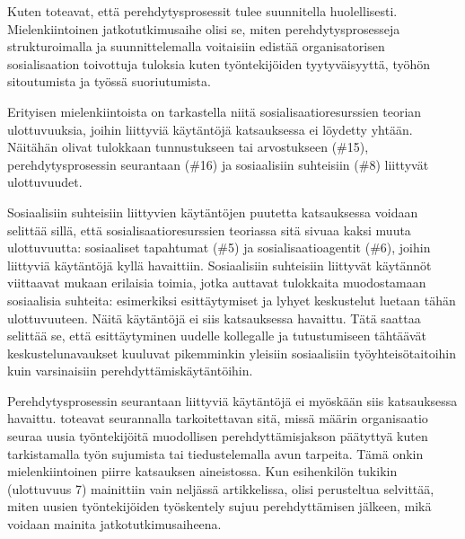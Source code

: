 \documentclass[utf8]{gradu3}
\begin{document}
Kuten \textcite{britto-ym-2020} toteavat, että perehdytysprosessit tulee suunnitella huolellisesti. Mielenkiintoinen jatkotutkimusaihe olisi se, miten perehdytysprosesseja strukturoimalla ja suunnittelemalla voitaisiin edistää organisatorisen sosialisaation toivottuja tuloksia kuten työntekijöiden tyytyväisyyttä, työhön sitoutumista ja työssä suoriutumista.

Erityisen mielenkiintoista on tarkastella niitä sosialisaatioresurssien teorian ulottuvuuksia, joihin liittyviä käytäntöjä katsauksessa ei löydetty yhtään. Näitähän olivat tulokkaan tunnustukseen tai arvostukseen (\#15), perehdytysprosessin seurantaan (\#16) ja sosiaalisiin suhteisiin (\#8) liittyvät ulottuvuudet. 

Sosiaalisiin suhteisiin liittyvien käytäntöjen puutetta katsauksessa voidaan selittää sillä, että sosialisaatioresurssien teoriassa sitä sivuaa kaksi muuta ulottuvuutta: sosiaaliset tapahtumat (\#5) ja sosialisaatioagentit (\#6), joihin liittyviä käytäntöjä kyllä havaittiin. Sosiaalisiin suhteisiin liittyvät käytännöt viittaavat \textcite{wanberg-2012} mukaan erilaisia toimia, jotka auttavat tulokkaita muodostamaan sosiaalisia suhteita: esimerkiksi esittäytymiset ja lyhyet keskustelut luetaan tähän ulottuvuuteen. Näitä käytäntöjä ei siis katsauksessa havaittu. Tätä saattaa selittää se, että esittäytyminen uudelle kollegalle ja tutustumiseen tähtäävät keskustelunavaukset kuuluvat pikemminkin yleisiin sosiaalisiin työyhteisötaitoihin kuin varsinaisiin perehdyttämiskäytäntöihin. 

Perehdytysprosessin seurantaan liittyviä käytäntöjä ei myöskään siis katsauksessa havaittu. \textcite{wanberg-2012} toteavat seurannalla tarkoitettavan sitä, missä määrin organisaatio seuraa uusia työntekijöitä muodollisen perehdyttämisjakson päätyttyä kuten tarkistamalla työn sujumista tai tiedustelemalla avun tarpeita. Tämä onkin mielenkiintoinen piirre katsauksen aineistossa. Kun esihenkilön tukikin (ulottuvuus 7) mainittiin vain neljässä artikkelissa, olisi perusteltua selvittää, miten uusien työntekijöiden työskentely sujuu perehdyttämisen jälkeen, mikä voidaan mainita jatkotutkimusaiheena.
\end{document}
